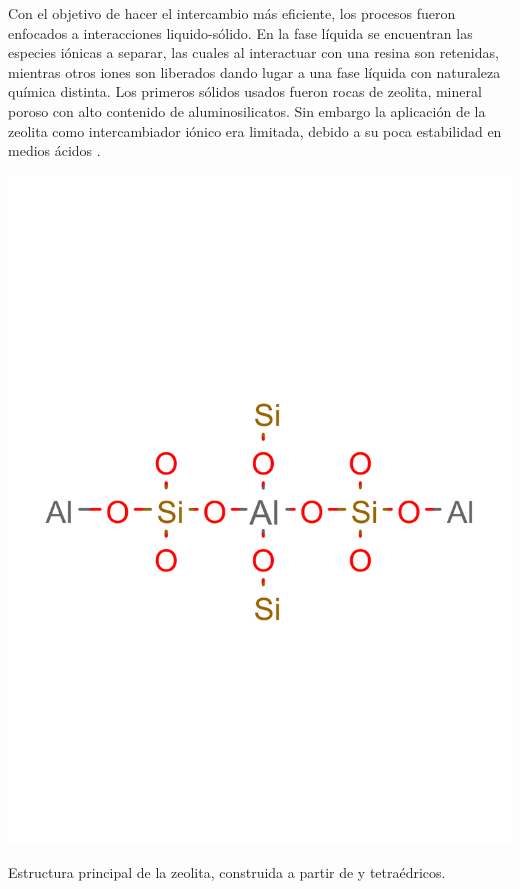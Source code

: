 \documentclass[fleqn,10pt]{SelfArx} %
\begin{document}
	Con el objetivo de hacer el intercambio m\'as eficiente, los procesos fueron enfocados a interacciones liquido-s\'olido. En la fase l\'iquida se encuentran las especies i\'onicas a separar, las cuales al interactuar con una resina son retenidas, mientras otros iones son liberados dando lugar a una fase l\'iquida con naturaleza qu\'imica distinta. Los primeros s\'olidos usados fueron rocas de zeolita, mineral poroso con alto contenido de aluminosilicatos. Sin embargo la aplicaci\'on de la zeolita como intercambiador i\'onico era limitada, debido a su poca estabilidad en medios \'acidos \cite{Chen}.
	\begin{scheme}[h]
	    \centering
	    \includegraphics[scale=0.2]{images/Zeolite.pdf}
	    \caption{Estructura principal de la zeolita, construida a partir de  y  tetra\'edricos.}
	    \label{sch:zeolita}
	\end{scheme}
	
\end{document}
